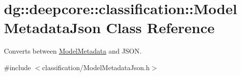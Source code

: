 \hypertarget{classdg_1_1deepcore_1_1classification_1_1_model_metadata_json}{}\section{dg\+:\+:deepcore\+:\+:classification\+:\+:Model\+Metadata\+Json Class Reference}
\label{classdg_1_1deepcore_1_1classification_1_1_model_metadata_json}


Converts between \hyperlink{classdg_1_1deepcore_1_1classification_1_1_model_metadata}{Model\+Metadata} and J\+S\+ON.  




{\ttfamily \#include $<$classification/\+Model\+Metadata\+Json.\+h$>$}

